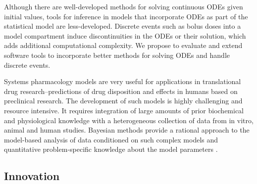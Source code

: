 \documentclass[11pt]{article}
\newcommand{\instructions}[1]{}
\begin{document}
Although there are well-developed methods for solving continuous ODEs
given initial values, tools for inference in models that incorporate
ODEs as part of the statistical model are less-developed. Discrete
events such as bolus doses into a model compartment induce
discontinuities in the ODEs or their solution, which adds additional
computational complexity. We propose to evaluate and extend software
tools to incorporate better methods for solving ODEs and handle
discrete events.

Systems pharmacology models are very useful for applications in
translational drug research--predictions of drug disposition and
effects in humans based on preclinical research. The development of
such models is highly challenging and resource intensive. It requires
integration of large amounts of prior biochemical and physiological
knowledge with a heterogeneous collection of data from in vitro,
animal and human studies. Bayesian methods provide a rational approach
to the model-based analysis of data conditioned on such complex models
and quantitative problem-specific knowledge about the model parameters
\citep[e.g.,][]{gelman-et-al:1996, leclerc-et-al:2016}.

\subsection*{Innovation}

\instructions{ Instructions: Explain how the application challenges and
    seeks to shift current research or clinical practice paradigms.
    Describe any novel theoretical concepts, approaches or
    methodologies, instrumentation or intervention(s) to be developed
    or used, and any advantage over existing methodologies,
    instrumentation or intervention(s).  Explain any refinements,
    improvements, or new applications of theoretical concepts,
    approaches or methodologies, instrumentation or interventions.}

\instructions{ Review criteria: Does the application challenge and seek
    to shift current research or clinical practice paradigms by
    utilizing novel theoretical concepts, approaches or methodologies,
    instrumentation, or interventions? Are the concepts, approaches or
    methodologies, instrumentation, or interventions novel to one
    field of research or novel in a broad sense? Is a refinement,
    improvement, or new application of theoretical concepts,
    approaches or methodologies, instrumentation, or interventions
    proposed? }
\end{document}
